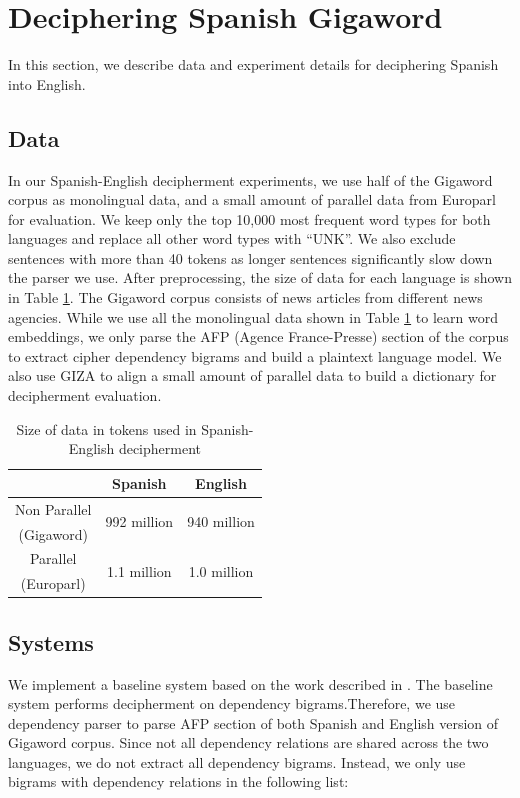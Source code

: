 \section{Deciphering Spanish Gigaword}
\label{decipher_gigaword}
In this section, we describe data and experiment details for deciphering Spanish into English.

\subsection{Data}

In our Spanish-English decipherment experiments, we use half of the Gigaword corpus as monolingual data, and a small amount of parallel data from Europarl for evaluation. We keep only the top 10,000 most frequent word types for both languages and replace all other word types with ``UNK''.  We also exclude sentences with more than 40 tokens as longer sentences significantly slow down the parser\cite{bohnet:2010:PAPERS}  we use. After preprocessing, the size of data for each language is shown in Table \ref{es-en-data}. The Gigaword corpus consists of news articles from different news agencies.  While we use all the monolingual data shown in Table \ref{es-en-data} to learn word embeddings, we only parse the AFP (Agence France-Presse) section of the corpus to extract cipher dependency bigrams and build a plaintext language model. We also use GIZA\cite{GIZA} to align a small amount of parallel data to build a dictionary for decipherment evaluation.

 \begin{table}
 \begin{center}
 \begin{tabular}{ |c|c|c| } \hline
             & Spanish & English \\ \hline
Non Parallel & \multirow{2}{*}{992 million} & \multirow{2}{*}{940 million} \\ 
(Gigaword) & &  \\ \hline
Parallel & \multirow{2}{*}{1.1 million} & \multirow{2}{*}{1.0 million} \\
(Europarl) & &  \\ \hline
 \end{tabular}
 \caption{Size of data in tokens used in Spanish-English decipherment}
 \label{es-en-data}
 \end{center}
 \end{table}

\subsection{Systems}
We implement a baseline system based on the work described in . The baseline system performs decipherment on dependency bigrams.Therefore, we use dependency parser to parse AFP section of both Spanish and English version of Gigaword corpus. Since not all dependency relations are shared across the two languages, we do not extract all dependency bigrams. Instead, we only use bigrams with dependency relations in the following list: 

